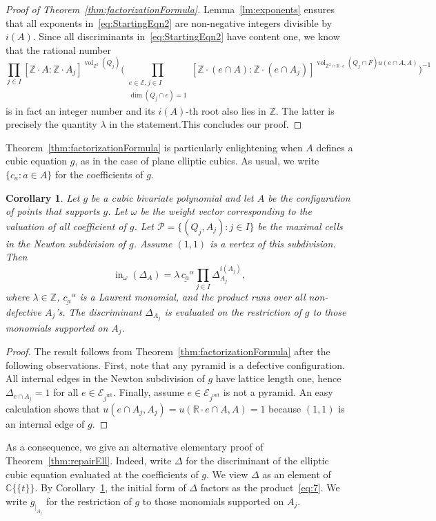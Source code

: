 \documentclass[11pt]{amsart}
\numberwithin{equation}{section}
\theoremstyle{plain}
\newtheorem{corollary}[theorem]{Corollary}
\theoremstyle{definition}
\theoremstyle{remark}
\begin{document}
\begin{proof}[Proof of Theorem~\ref{thm:factorizationFormula}]
Lemma~\ref{lm:exponents} ensures that all exponents
in~\eqref{eq:StartingEqn2} are non-negative integers divisible by
$i(A)$. Since all discriminants in~\eqref{eq:StartingEqn2} have
content one, we know that the rational number 
\[
 \prod_{j\in I}[{\mathbb{Z}}{\!\cdot\!} A: {\mathbb{Z}}{\!\cdot\!}
      A_j]^{\operatorname{\operatorname{vol}}_{{\mathbb{Z}}^2}(Q_j)} \big( \prod_{\substack{e\in \mathcal{E},j\in I\\ \dim(Q_j\cap e)=1}}
      \!\!\![{\mathbb{Z}}{\!\cdot\!}(e\cap A): {\mathbb{Z}}{\!\cdot\!}(e \cap
      A_j)]^{\operatorname{\operatorname{vol}}_{{\mathbb{Z}}^2\cap {\mathbb{R}}{\!\cdot\!} e}(Q_j\cap F)u(e\cap A,A)}\big)^{-1}
\]
is in fact an integer number and its $i(A)$-th root also lies in
${\mathbb{Z}}$. The latter is precisely the quantity $\lambda$ in the
statement.This concludes our proof.
\end{proof}

Theorem~\ref{thm:factorizationFormula} is particularly enlightening
when $A$ defines a cubic equation $g$, as in the case of plane elliptic
cubics. As usual, we write $\{c_a: a\in A\}$ for the coefficients of $g$.
 \begin{corollary}\label{cor:initialDiscriminant}
   Let $g$ be a cubic bivariate polynomial and let $A$ be the
   configuration of points that supports $g$. Let ${\omega}$ be the weight
   vector corresponding to the valuation of all coefficient of
   $g$. Let ${\mathcal{P}}=\{(Q_j,A_j): j\in I\}$ be the maximal cells in the
   Newton subdivision of $g$. Assume $(1,1)$ is a vertex of this
   subdivision. Then
\begin{equation}
  \operatorname{in}_{\omega}(\Delta_A)=\lambda \,\underline{c_{a}}^{\alpha}\prod_{j\in I} \Delta_{A_j}^{i(A_j)},\label{eq:7}
\end{equation}
where $\lambda\in {\mathbb{Z}}$, $\underline{c_a}^{\alpha}$ is a Laurent
monomial, and the product runs over all non-defective $A_j$'s. The
discriminant $\Delta_{A_j}$ is evaluated on the restriction of $g$ to
those monomials supported on $A_j$.
 \end{corollary}
 \begin{proof}
   The result follows from Theorem~\ref{thm:factorizationFormula}
   after the following observations. First, note that any pyramid is a
   defective configuration. All internal edges in the Newton
   subdivision of $g$ have lattice length one, hence $\Delta_{e\cap
     A_j}=1$ for all $e\in \mathcal{E}_j^\operatorname{int}$.  Finally, assume
   $e\in \mathcal{E}_j^\operatorname{out}$ is not a pyramid. An easy
   calculation shows that $u(e\cap A_j,A_j)=u({\mathbb{R}}{\!\cdot\!} e\cap
   A,A)=1$ because $(1,1)$ is an internal edge of $g$.
 \end{proof}
 As a consequence, we give an alternative elementary proof of
 Theorem~\ref{thm:repairEll}. Indeed, write $\Delta$ for the
 discriminant of the elliptic cubic equation evaluated at the
 coefficients of $g$. We view $\Delta$ as an element of ${{\mathbb{C}}\{\!\{t
\}\!\}}$. By
 Corollary~\ref{cor:initialDiscriminant}, the initial form of $\Delta$
 factors as the product~\eqref{eq:7}. We write $g_{|_{A_j}}$ for the
 restriction of $g$ to those monomials supported on $A_j$.
\end{document}
